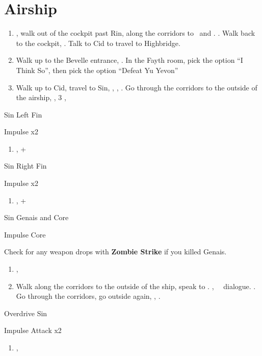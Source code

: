 \chapter{Airship}
\begin{enumerate}
    \item \sd, walk out of the cockpit past Rin, along the corridors to \yuna\ and \kimahri. \sd. Walk back to the cockpit, \sd. Talk to Cid to travel to Highbridge.
    \item Walk up to the Bevelle entrance, \sd. In the Fayth room, pick the  option ``I Think So'', then pick the  option ``Defeat Yu Yevon''
    \item Walk up to Cid, travel to Sin, \sd, \skippablefmv, \sd. Go through the corridors to the outside of the airship, \sd, 3 \skippablefmv[2:10], \sd
\end{enumerate}
\begin{battle}[65000]{Sin Left Fin}
    \begin{itemize}
        \summon{\bahamut}
        \bahamutf Impulse x2
    \end{itemize}
\end{battle}
\begin{enumerate}[resume]
    \item \sd, \cs+\skippablefmv
\end{enumerate}
\begin{battle}[65000]{Sin Right Fin}
    \begin{itemize}
        \summon{\bahamut}
        \bahamutf Impulse x2
    \end{itemize}
\end{battle}
\begin{enumerate}[resume]
    \item \sd, \cs+\skippablefmv
\end{enumerate}
\begin{battle}[56000]{Sin Genais and Core}
    \begin{itemize}
        \summon{\bahamut}
        \bahamutf Impulse Core
    \end{itemize}
    Check for any weapon drops with \textbf{Zombie Strike} if you killed Genais.
\end{battle}
\begin{enumerate}[resume]
    \item \sd, \skippablefmv
    \item Walk along the corridors to the outside of the ship, speak to \yuna. \cs[1:40], \sd\ \rikku\ dialogue. \skippablefmv. Go through the corridors, go outside again, \skippablefmv, \sd.
\end{enumerate}
\begin{battle}[140000]{Overdrive Sin}
    \begin{itemize}
        \summon{\bahamut}
        \bahamutf Impulse
        \bahamutf Attack x2
    \end{itemize}
\end{battle}
\begin{enumerate}[resume]
    \item \skippablefmv[1:20], \sd
\end{enumerate}